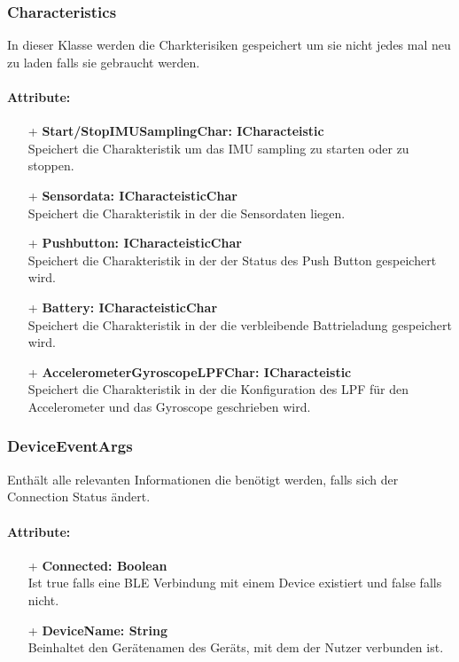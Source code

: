 \documentclass[a4paper,12pt]{article}
\begin{document}
\subsubsection{Characteristics}
In dieser Klasse werden die Charkterisiken gespeichert um sie nicht jedes mal neu zu laden falls sie gebraucht werden.

\paragraph{Attribute:}
\begin{itemize}
	\item[+] \textbf{Start/StopIMUSamplingChar: ICharacteistic}\\Speichert die Charakteristik um das IMU sampling zu starten oder zu stoppen.
	\item[+] \textbf{Sensordata: ICharacteisticChar}\\Speichert die Charakteristik in der die Sensordaten liegen.
	\item[+] \textbf{Pushbutton: ICharacteisticChar}\\Speichert die Charakteristik in der der Status des Push Button gespeichert wird.
	\item[+] \textbf{Battery: ICharacteisticChar}\\Speichert die Charakteristik in der die verbleibende Battrieladung gespeichert wird.
	\item[+] \textbf{AccelerometerGyroscopeLPFChar: ICharacteistic}\\Speichert die Charakteristik in der die Konfiguration des LPF für den Accelerometer und das Gyroscope geschrieben wird.
\end{itemize}


\subsubsection{DeviceEventArgs}
Enthält alle relevanten Informationen die benötigt werden, falls sich der Connection Status ändert.

\paragraph{Attribute:}
\begin{itemize}
	\item[+] \textbf{Connected: Boolean}\\Ist true falls eine BLE Verbindung mit einem Device existiert und false falls nicht.
	\item[+] \textbf{DeviceName: String}\\Beinhaltet den Gerätenamen des Geräts, mit dem der Nutzer verbunden ist. 
\end{itemize}
\end{document}
